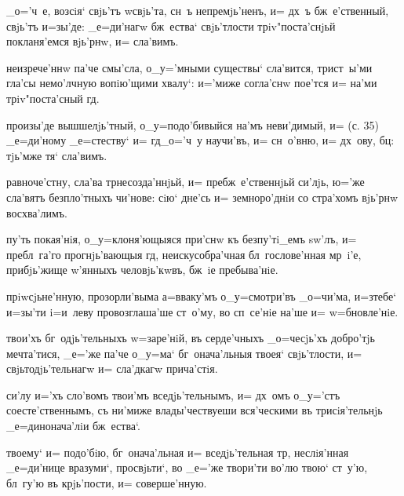 _о='ч~е, возсiя` свjь'тъ w\т свjь'та, сн~ъ непремjь'ненъ, 
и= дх~ъ бж~е'ственный, свjь'тъ и=зы'де: _е=ди'нагw 
бж~ества` свjь'тлости трiv"поста'снjьй покланя'емся 
вjь'рнw, и= сла'вимъ.

неизрече'ннw па'че смы'сла, о_у='мными существы` 
сла'вится, трист~ы'ми гла'сы немо'лчную вопiю'щими 
хвалу`: и='миже согла'снw пое'тся и= на'ми 
трiv"поста'сный гд.

произы'де вышшелjь'тный, о_у=подо'бивыйся на'мъ 
неви'димый, и= (с. 35) _е=ди'ному _е=стеству` и= 
гд _о='ч~у научи'въ, и= сн~о'вню, и= дх~ову, 
бц: тjь'мже тя` сла'вимъ.



равноче'стну, сла'ва тр несозда'ннjьй, и= 
пребж~е'ственнjьй си'лjь, ю='же сла'вятъ безпло'тныхъ 
чи'нове: сiю` дне'сь и= земноро'днiи со стра'хомъ вjь'рнw 
восхва'лимъ.

пу'ть покая'нiя, о_у=клоня'ющыяся при'снw къ безпу'тi_емъ 
sw'лъ, и= пребл~га'го прогнjь'вающыя гд, 
неискусобра'чная бл~гослове'нная мр~i'е, прибjь'жище 
w'янныхъ человjь'кwвъ, бж~iе пребыва'нiе.


прiwсjьне'нную, прозорли'выма а=вваку'мъ о_у=смотри'въ 
_о=чи'ма, и=з\ъ тебе` и=зы'ти i=и~леву провозглаша'ше 
ст~о'му, во сп~се'нiе на'ше и= w=бновле'нiе.

твои'хъ бг~одjь'тельныхъ w=заре'нiй, въ серде'чныхъ 
_о=чесjь'хъ добро'тjь мечта'тися, _е='же па'че о_у=ма` 
бг~онача'льныя твоея` свjь'тлости, и= свjьтодjь'тельнагw 
и= сла'дкагw прича'стiя.

си'лу и='хъ сло'вомъ твои'мъ вседjь'тельнымъ, и= дх~омъ 
о_у='стъ соесте'ственнымъ, съ ни'миже влады'чествуеши 
вся'ческими въ трисiя'тельнjь _е=динонача'лiи бж~ества`.

твоему` и= подо'бiю, бг~онача'льная и= вседjь'тельная 
тр, неслiя'нная _е=ди'нице вразуми`, просвjьти`, во 
_е='же твори'ти во'лю твою` ст~у'ю, бл~гу'ю въ 
крjь'пости, и= соверше'нную.

